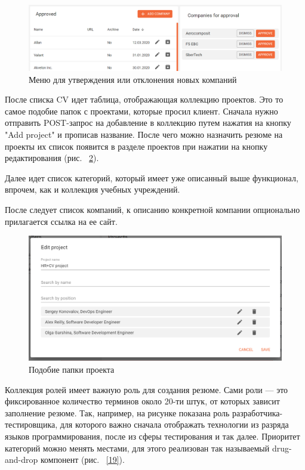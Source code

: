 \documentclass[a4paper,12pt]{diplom}
\begin{document}
\begin{figure}[!ht]
\centering
\includegraphics[width=1\textwidth]{resources/companies.png}
\caption{Меню для утверждения или отклонения новых компаний}
\label{17}
\end{figure}
После списка CV идет таблица, отображающая коллекцию проектов. Это то самое подобие папок с проектами, которые просил клиент. Сначала нужно отправить POST-запрос на добавление в коллекцию
путем нажатия на кнопку "Add project" и прописав название. После чего можно назначить резюме на проекты их список появится в разделе проектов при нажатии на кнопку редактирования (рис. ~\ref{18}).

Далее идет список категорий, который имеет уже описанный выше функционал, впрочем, как и коллекция учебных учреждений.

После следует список компаний, к описанию конкретной компании опционально прилагается ссылка на ее сайт.

\begin{figure}[!ht]
\centering
\includegraphics[width=1\textwidth]{resources/editProject.png}
\caption{Подобие папки проекта}
\label{18}
\end{figure}

Коллекция ролей имеет важную роль для создания резюме. Сами роли — это фиксированное количество терминов около 20-ти штук, от которых зависит заполнение резюме.
Так, например, на рисунке показана роль разработчика-тестировщика, для которого важно сначала отображать технологии из разряда языков программирования, после из сферы тестирования и так далее.
Приоритет категорий можно менять местами, для этого реализован так называемый drug-and-drop компонент (рис. ~\ref{19}).
\end{document}

